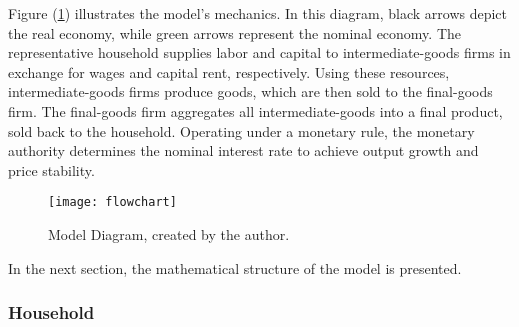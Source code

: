 \documentclass[../thesis.tex]{subfiles}
\begin{document}

Figure (\ref{fig_v6:model-diagram}) illustrates the model's mechanics. In this diagram, black arrows depict the real economy, while green arrows represent the nominal economy. The representative household supplies labor and capital to intermediate-goods firms in exchange for wages and capital rent, respectively. Using these resources, intermediate-goods firms produce goods, which are then sold to the final-goods firm. The final-goods firm aggregates all intermediate-goods into a final product, sold back to the household. Operating under a monetary rule, the monetary authority determines the nominal interest rate to achieve output growth and price stability.

\begin{figure}[h!]
	\centering
	\texttt{[image: flowchart]}
	\caption{Model Diagram, created by the author.}
	\label{fig_v6:model-diagram}
\end{figure}

In the next section, the mathematical structure of the model is presented.

\newpage




\subsubsection{Household}
\end{document}
